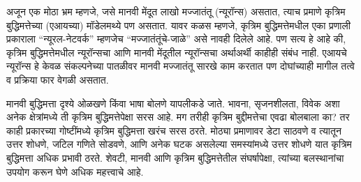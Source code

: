 अजून एक मोठा भ्रम म्हणजे, जसे मानवी मेंदूत लाखो मज्जातंतू (न्यूरॉन्स) असतात, त्याच प्रमाणे कृत्रिम बुद्धिमत्तेच्या (एआयच्या) मॉडेलमथ्ये पण असतात. यावर कळस म्हणजे, कृत्रिम बुद्धिमत्तेमधील एका प्रणाली प्रकाराला “न्यूरल-नेटवर्क” म्हणजेच “मज्जातंतूंचे-जाळे” असे नावही दिलेले आहे. पण सत्य हे आहे की,  कृत्रिम बुद्धिमत्तेमधील न्यूरॉन्सचा आणि मानवी मेंदूतील न्यूरॉन्सचा अर्थाअर्थी काहीही संबंध नाही. एआयचे न्यूरॉन्स हे केवळ संकल्पनेच्या पातळीवर मानवी मज्जातंतू सारखे काम करतात पण दोघांच्याही मागील तत्वे व प्रक्रिया फार वेगळी असतात. 

मानवी बुद्धिमत्ता दृश्ये ओळखणे किंवा भाषा बोलणे यापलीकडे जाते. भावना, सृजनशीलता, विवेक अशा अनेक क्षेत्रांमध्ये ती कृत्रिम बुद्धिमत्तेपेक्षा सरस आहे. मग तरीही कृत्रिम बुद्दीमत्तेचा एवढा बोलबाला का? तर काही प्रकारच्या गोष्टींमध्ये कृत्रिम बुद्धिमत्ता खरंच सरस ठरते. मोठ्या प्रमाणावर डेटा साठवणे व त्यातून उत्तर शोधणे, जटिल गणिते सोडवणे, आणि अनेक घटक असलेल्या समस्यांमध्ये उत्तर शोधणे यात कृत्रिम बुद्धिमत्ता अधिक प्रभावी ठरते. शेवटी, मानवी आणि कृत्रिम बुद्धिमत्तेतील संघर्षापेक्षा, त्यांच्या बलस्थानांचा उपयोग करून घेणे अधिक महत्त्वाचे आहे.



